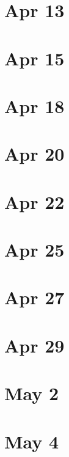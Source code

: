 \documentclass[12pt]{book}
\newcommand{\<}{\langle}
\renewcommand{\>}{\rangle}
\numberwithin{equation}{section}
\theoremstyle{plain}
\theoremstyle{definition}
\theoremstyle{remark}
\begin{document}
\section*{Apr 13}

\section*{Apr 15}

\section*{Apr 18}

\section*{Apr 20}

\section*{Apr 22}

\section*{Apr 25}

\section*{Apr 27}

\section*{Apr 29}

\section*{May 2}

\section*{May 4}




\newpage
\end{document}
